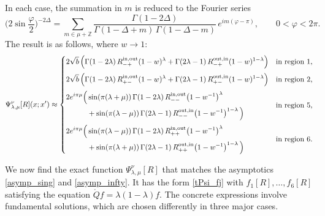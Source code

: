 \documentclass[12pt]{article}
\newcommand{\vp}{\varphi}
\newcommand{\ZZ}{\mathbb{Z}}
\newcommand{\IN}{\text{in}}
\newcommand{\OUT}{\text{out}}
\newcommand{\rQ}{\mathring{Q}}
\begin{document}
In each case, the summation in $m$ is reduced to the Fourier series
\begin{equation}
\biggl(2\sin\frac{\vp}{2}\biggr)^{-2\Delta} =\sum_{m\in\mu+\ZZ}
\frac{\Gamma(1-2\Delta)}{\Gamma(1-\Delta+m)\,\Gamma(1-\Delta-m)}\,
e^{im(\vp-\pi)},\qquad 0<\vp<2\pi.
\end{equation}
The result is as follows, where $w\to 1$:
\begin{equation}\label{asymp_infty}
\Psi^{\nu}_{\lambda,\mu}[R](x;x')\approx
\begin{dcases}
2\sqrt{b}\,\Bigl(\Gamma(1-2\lambda)\,R^{\IN,\OUT}_{-+}(1-w)^{\lambda}
+\Gamma(2\lambda-1)\,R^{\OUT,\IN}_{-+}(1-w)^{1-\lambda}\Bigr)
& \text{in region }1,
\\[2pt]
2\sqrt{b}\,\Bigl(\Gamma(1-2\lambda)\,R^{\IN,\OUT}_{+-}(1-w)^{\lambda}
+\Gamma(2\lambda-1)\,R^{\OUT,\IN}_{+-}(1-w)^{1-\lambda}\Bigr)
& \text{in region }2,
\\[2pt]
\begin{aligned}
2e^{i\pi\mu}\Bigl(
&\sin(\pi(\lambda+\mu))\,\Gamma(1-2\lambda)\,
R^{\IN,\OUT}_{--}\bigl(1-w^{-1}\bigr)^{\lambda}\\
&+\sin(\pi(\lambda-\mu))\,\Gamma(2\lambda-1)\,
R^{\OUT,\IN}_{--}\bigl(1-w^{-1}\bigr)^{1-\lambda}\,\Bigr)
\end{aligned}
& \text{in region }5,
\\[2pt]
\begin{aligned}
2e^{i\pi\mu}\Bigl(&\sin(\pi(\lambda-\mu))\,\Gamma(1-2\lambda)\,
R^{\IN,\OUT}_{++}\bigl(1-w^{-1}\bigr)^{\lambda}\\
&+\sin(\pi(\lambda+\mu))\,\Gamma(2\lambda-1)\,
R^{\OUT,\IN}_{++}\bigl(1-w^{-1}\bigr)^{1-\lambda}\,\Bigr)
\end{aligned}
& \text{in region }6.
\end{dcases}
\end{equation}

We now find the exact function $\Psi^{\nu}_{\lambda,\mu}[R]$ that matches the asymptotics \eqref{asymp_sing} and \eqref{asymp_infty}. It has the form \eqref{tPsi_fj} with $f_{1}[R],\ldots,f_{6}[R]$ satisfying the equation $\rQ f=\lambda(1-\lambda)f$. The concrete expressions involve fundamental solutions, which are chosen differently in three major cases.
\end{document}
